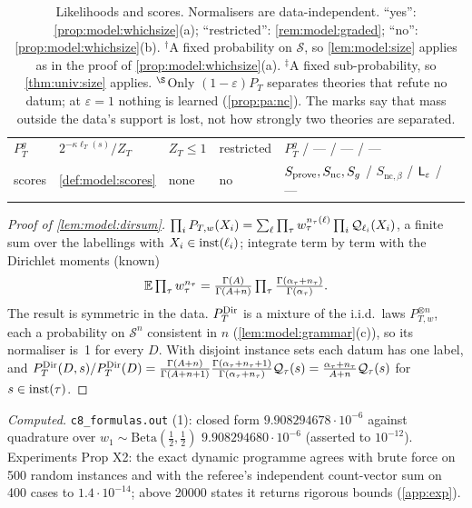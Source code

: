 \begin{table}[ht]
\begin{tabularx}{\textwidth}{@{}lXllp{4.6cm}@{}}
$P^g_T$ & $2^{-\kappa\ell_T(s)}/Z_T$ & $Z_T\le1$ & restricted & $P^g_T$ / --- / --- / ---\\
scores & \cref{def:model:scores} & none & no & $S_{\mathrm{prove}},S_{\mathrm{nc}},S_{g}$ / $S_{\mathrm{nc},\beta}$ / $\mathsf{L}_{\varepsilon}$ / ---\\
\bottomrule
\end{tabularx}
\caption{Likelihoods and scores. Normalisers are data-independent. ``yes'': \cref{prop:model:whichsize}(a); ``restricted'': \cref{rem:model:graded}; ``no'': \cref{prop:model:whichsize}(b). $^\dagger$A fixed probability on $\mathcal S$, so \cref{lem:model:size} applies as in the proof of \cref{prop:model:whichsize}(a). $^\ddagger$A fixed sub-probability, so \cref{thm:univ:size} applies. $^\S$Only $(1-\varepsilon)P_T$ separates theories that refute no datum; at $\varepsilon=1$ nothing is learned (\cref{prop:pa:nc}). The marks say that mass outside the data's support is lost, not how strongly two theories are separated.}
\label{tab:model:likelihoods}
\end{table}

\begin{proof}[Proof of \cref{lem:model:dirsum}]
$\prod_iP_{T,w}(X_i)=\sum_\ell\prod_\tau w_\tau^{n_\tau(\ell)}\prod_i\mathcal{Q}_{\ell_i}(X_i)$, a finite sum over the labellings with $X_i\in\mathrm{inst}(\ell_i)$; integrate term by term with the Dirichlet moments (known)
\[\mathbb{E}\textstyle\prod_\tau w_\tau^{n_\tau}=\frac{\Gamma(A)}{\Gamma(A+n)}\prod_\tau\frac{\Gamma(\alpha_\tau+n_\tau)}{\Gamma(\alpha_\tau)}.\] The result is symmetric in the data. $P^{\mathrm{Dir}}_{T}$ is a mixture of the i.i.d.\ laws $P_{T,w}^{\otimes n}$, each a probability on $\mathcal S^n$ consistent in $n$ (\cref{lem:model:grammar}(c)), so its normaliser is~1 for every $D$. With disjoint instance sets each datum has one label, and $P^{\mathrm{Dir}}_{T}(D,s)/P^{\mathrm{Dir}}_{T}(D)=\frac{\Gamma(A+n)}{\Gamma(A+n+1)}\frac{\Gamma(\alpha_\tau+n_\tau+1)}{\Gamma(\alpha_\tau+n_\tau)}\mathcal{Q}_\tau(s)=\frac{\alpha_\tau+n_\tau}{A+n}\mathcal{Q}_\tau(s)$ for $s\in\mathrm{inst}(\tau)$.
\end{proof}

\emph{Computed.} \texttt{c8\_formulas.out} (1): closed form $9.908294678\cdot10^{-6}$ against quadrature over $w_1\sim\mathrm{Beta}(\tfrac12,\tfrac12)$ $9.908294680\cdot10^{-6}$ (asserted to $10^{-12}$). Experiments Prop X2: the exact dynamic programme agrees with brute force on 500 random instances and with the referee's independent count-vector sum on 400 cases to $1.4\cdot10^{-14}$; above 20000 states it returns rigorous bounds (\cref{app:exp}).

